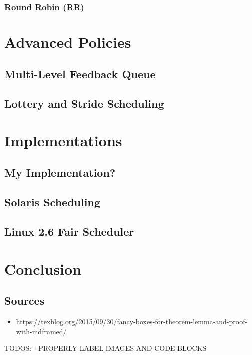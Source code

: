 \documentclass{report}
\begin{document}
\section{Round Robin (RR)}





\part{Advanced Policies}

\chapter{Multi-Level Feedback Queue}

\chapter{Lottery and Stride Scheduling}

\part{Implementations}

\chapter{My Implementation?}

\chapter{Solaris Scheduling}

\chapter{Linux 2.6 Fair Scheduler}



\part{Conclusion}

\chapter*{Sources}

\begin{itemize}
    \item \url{https://texblog.org/2015/09/30/fancy-boxes-for-theorem-lemma-and-proof-with-mdframed/}
\end{itemize}


TODOS:
- PROPERLY LABEL IMAGES AND CODE BLOCKS
\end{document}
